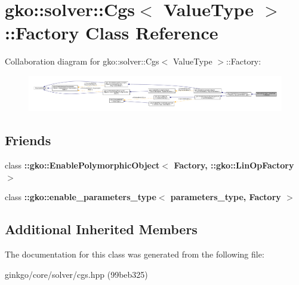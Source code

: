 \hypertarget{classgko_1_1solver_1_1Cgs_1_1Factory}{}\section{gko\+:\+:solver\+:\+:Cgs$<$ Value\+Type $>$\+:\+:Factory Class Reference}
\label{classgko_1_1solver_1_1Cgs_1_1Factory}


Collaboration diagram for gko\+:\+:solver\+:\+:Cgs$<$ Value\+Type $>$\+:\+:Factory\+:
\nopagebreak
\begin{figure}[H]
\begin{center}
\leavevmode
\includegraphics[width=350pt]{classgko_1_1solver_1_1Cgs_1_1Factory__coll__graph}
\end{center}
\end{figure}
\subsection*{Friends}
\begin{DoxyCompactItemize}
\item 
\mbox{\label{classgko_1_1solver_1_1Cgs_1_1Factory_a27e9bbc94a1c1c59f40833153eda8f78}} 
class {\bfseries \+::gko\+::\+Enable\+Polymorphic\+Object$<$ Factory, \+::gko\+::\+Lin\+Op\+Factory $>$}
\item 
\mbox{\label{classgko_1_1solver_1_1Cgs_1_1Factory_a0d176cbd42d6214e11aee8c30ca256fc}} 
class {\bfseries \+::gko\+::enable\+\_\+parameters\+\_\+type$<$ parameters\+\_\+type, Factory $>$}
\end{DoxyCompactItemize}
\subsection*{Additional Inherited Members}


The documentation for this class was generated from the following file\+:\begin{DoxyCompactItemize}
\item 
ginkgo/core/solver/cgs.\+hpp (99beb325)\end{DoxyCompactItemize}
